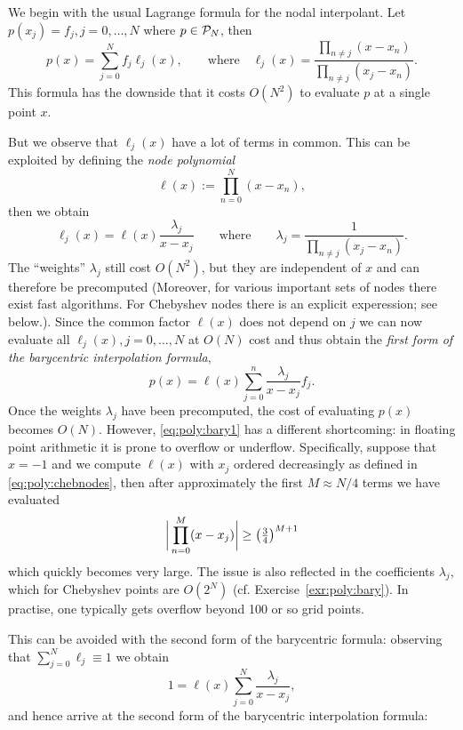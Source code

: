 We begin with the usual Lagrange formula for the nodal interpolant. 
Let $p(x_j) = f_j, j = 0, \dots, N$ where $p \in \mathcal{P}_N$, then  
\[
   p(x) = \sum_{j = 0}^N f_j \ell_j(x), 
   \qquad \text{where} \quad 
   \ell_j(x) = \frac{ \prod_{n \neq j} (x - x_n)}{\prod_{n \neq j} (x_j-x_n)}.
\]
This formula has the downside that it costs $O(N^2)$ to evaluate $p$ at a 
single point $x$. 

But we observe that $\ell_j(x)$ have a lot of terms in common. This can be 
exploited by defining the {\em node polynomial}
\[
   \ell(x) := \prod_{n = 0}^N (x-x_n),
\]
then we obtain 
\begin{equation} \label{eq:poly:bary_weights}
   \ell_j(x) = \ell(x) \frac{\lambda_j}{x - x_j} 
   \qquad \text{where}  \qquad 
   \lambda_j = \frac{1}{\prod_{n \neq j} (x_j - x_n)}.
\end{equation}
The ``weights'' $\lambda_j$ still cost $O(N^2)$, but they are independent of $x$
and can therefore be precomputed (Moreover, for various important sets of nodes
there exist fast algorithms. For Chebyshev nodes there is an explicit
experession; see below.). Since the common factor $\ell(x)$ does not depend on
$j$ we can now evaluate all $\ell_j(x), j = 0, \dots, N$ at $O(N)$ cost and thus
obtain the {\em first form of the barycentric interpolation formula}, 
\begin{equation} \label{eq:poly:bary1}
   p(x) = \ell(x) \sum_{j = 0}^n \frac{\lambda_j}{x - x_j} f_j.
\end{equation}
Once the weights $\lambda_j$ have been precomputed, the cost of evaluating 
$p(x)$ becomes $O(N)$. However, \eqref{eq:poly:bary1} has a different 
shortcoming: in floating point arithmetic it is prone to overflow or underflow.
Specifically, suppose that $x = -1$ and we compute $\ell(x)$ with $x_j$ 
ordered decreasingly as defined in \eqref{eq:poly:chebnodes}, then after 
approximately the first $M \approx N/4$ terms we have evaluated 
\[
   \bigg|\prod_{n = 0}^M (x - x_j) \bigg|
   \geq \big( {\textstyle \frac{3}{4}} \big)^{M+1} 
\]
which quickly becomes very large. The issue is also reflected in the
coefficients $\lambda_j$, which for Chebyshev points are $O(2^N)$ (cf.
Exercise~\ref{exr:poly:bary}). In practise, one typically gets overflow 
beyond 100 or so grid points. 

This can be avoided with the second form of the barycentric formula: observing
that $\sum_{j = 0}^N \ell_j \equiv 1$ we obtain 
\[
   1 = \ell(x) \sum_{j = 0}^N \frac{\lambda_j}{x-x_j}, 
\]
and hence arrive at the second form of the barycentric interpolation formula:

